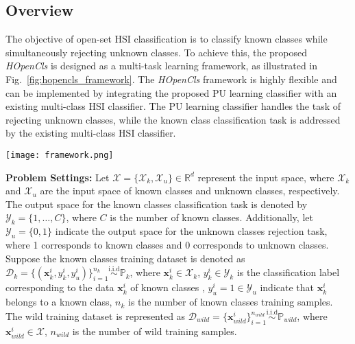 \subsection{Overview}

The objective of open-set HSI classification is to classify known classes while simultaneously rejecting unknown classes. To achieve this, the proposed \textit{HOpenCls} is designed as a multi-task learning framework, as illustrated in Fig.~\ref{fig:hopencls_framework}. The \textit{HOpenCls} framework is highly flexible and can be implemented by integrating the proposed PU learning classifier with an existing multi-class HSI classifier. The PU learning classifier handles the task of rejecting unknown classes, while the known class classification task is addressed by the existing multi-class HSI classifier.

\begin{figure*}[!t]
    \centering
    \texttt{[image: framework.png]}
    \caption{The proposed \emph{HOpenCls} framework. This framework can effectively leverage the wild data for open-set HSI classification. This framework includes multi-PU head, gradient contraction (Grad-C) and gradient expansion (Grad-E) PU learning algorithm. The PU learning component handles the rejection of unknown classes, while the classification of known classes is performed using an existing multi-class HSI classifier.}
    \label{fig:hopencls_framework}
\end{figure*}

\noindent \textbf{Problem Settings:}
Let $\mathcal{X}=\{\mathcal{X}_{k}, \mathcal{X}_{u}\} \in \mathbb{R}^{d}$ represent the input space, where $\mathcal{X}_{k}$ and $\mathcal{X}_{u}$ are the input space of known classes and unknown classes, respectively. The output space for the known classes classification task is denoted by $\mathcal{Y}_{k}=\{1,\dots,C\}$, where $C$ is the number of known classes. Additionally, let $\mathcal{Y}_{u}=\{0,1\}$ indicate the output space for the unknown classes rejection task, where 1 corresponds to known classes and 0 corresponds to unknown classes. Suppose the known classes training dataset is denoted as $\mathcal{D}_{k}=\{(\boldsymbol{x}^{i}_{k},y^{i}_{k},y^{i}_{u})\}_{i=1}^{n_{k}}\stackrel{\text{i.i.d}}{\sim}\mathbb{P}_{k}$, where $\boldsymbol{x}^{i}_{k} \in \mathcal{X}_{k}$, $y^{i}_{k} \in \mathcal{Y}_{k}$ is the classification label corresponding to the data $\boldsymbol{x}^{i}_{k}$ of known classes , $y^{i}_{u}=1 \in \mathcal{Y}_{u}$ indicate that $\boldsymbol{x}^{i}_{k}$ belongs to a known class, $n_{k}$ is the number of known classes training samples. The wild training dataset is represented as $\mathcal{D}_{wild}=\{\boldsymbol{x}^{i}_{wild}\}_{i=1}^{n_{wild}}\stackrel{\text{i.i.d}}{\sim}\mathbb{P}_{wild}$, where $\boldsymbol{x}^{i}_{wild} \in \mathcal{X}$, $n_{wild}$ is the number of wild training samples.

